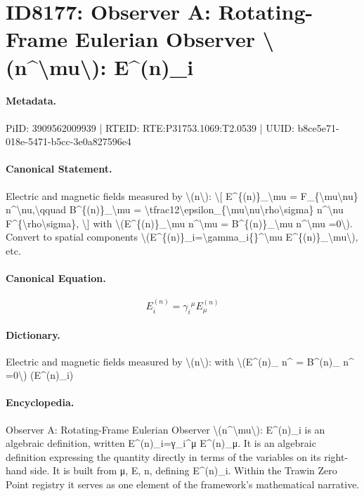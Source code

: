 \section*{ID8177: Observer A: Rotating-Frame Eulerian Observer \textbackslash{}(n\textasciicircum{}\textbackslash{}mu\textbackslash{}): E\textasciicircum{}(n)\_i}
\paragraph{Metadata.}
PiID: 3909562009939 | RTEID: RTE:P31753.1069:T2.0539 | UUID: b8ce5e71-018e-5471-b5cc-3e0a827596e4

\paragraph{Canonical Statement.}
Electric and magnetic fields measured by \textbackslash{}(n\textbackslash{}): \textbackslash{}[ E\textasciicircum{}\{(n)\}\_\textbackslash{}mu = F\_\{\textbackslash{}mu\textbackslash{}nu\} n\textasciicircum{}\textbackslash{}nu,\textbackslash{}qquad B\textasciicircum{}\{(n)\}\_\textbackslash{}mu = \textbackslash{}tfrac12\textbackslash{}epsilon\_\{\textbackslash{}mu\textbackslash{}nu\textbackslash{}rho\textbackslash{}sigma\} n\textasciicircum{}\textbackslash{}nu F\textasciicircum{}\{\textbackslash{}rho\textbackslash{}sigma\}, \textbackslash{}] with \textbackslash{}(E\textasciicircum{}\{(n)\}\_\textbackslash{}mu n\textasciicircum{}\textbackslash{}mu = B\textasciicircum{}\{(n)\}\_\textbackslash{}mu n\textasciicircum{}\textbackslash{}mu =0\textbackslash{}). Convert to spatial components \textbackslash{}(E\textasciicircum{}\{(n)\}\_i=\textbackslash{}gamma\_i\{\}\textasciicircum{}\textbackslash{}mu E\textasciicircum{}\{(n)\}\_\textbackslash{}mu\textbackslash{}), etc.

\paragraph{Canonical Equation.}
\[
E^{(n)}_i=\gamma_i{}^\mu E^{(n)}_\mu
\]

\paragraph{Dictionary.}
Electric and magnetic fields measured by \textbackslash{}(n\textbackslash{}): with \textbackslash{}(E\textasciicircum{}(n)\_ n\textasciicircum{} = B\textasciicircum{}(n)\_ n\textasciicircum{} =0\textbackslash{}) (E\textasciicircum{}(n)\_i)

\paragraph{Encyclopedia.}
Observer A: Rotating-Frame Eulerian Observer \textbackslash{}(n\textasciicircum{}\textbackslash{}mu\textbackslash{}): E\textasciicircum{}(n)\_i is an algebraic definition, written E\textasciicircum{}(n)\_i=γ\_i\textasciicircum{}μ E\textasciicircum{}(n)\_μ. It is an algebraic definition expressing the quantity directly in terms of the variables on its right-hand side. It is built from μ, E, n, defining E\textasciicircum{}(n)\_i. Within the Trawin Zero Point registry it serves as one element of the framework's mathematical narrative.
